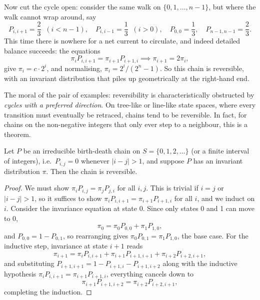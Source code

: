 \documentclass[a4paper]{scrartcl}
\begin{document}
\begin{example}
	Now cut the cycle open: consider the same walk on $\{0, 1, \dots, n - 1\}$, but where the walk cannot wrap around, say
	$$
	P_{i, i + 1} = \frac{2}{3} \;\; (i < n - 1), \quad P_{i, i - 1} = \frac{1}{3} \;\; (i > 0), \quad P_{0, 0} = \frac{1}{3}, \quad P_{n - 1, n - 1} = \frac{2}{3}.
	$$
	This time there is nowhere for a net current to circulate, and indeed detailed balance succeeds: the equations
	$$
	\pi_i P_{i, i + 1} = \pi_{i + 1}P_{i + 1, i} \implies \pi_{i + 1} = 2\pi_i,
	$$
	give $\pi_i = c \cdot 2^i$, and normalising, $\pi_i = 2^i / (2^n - 1)$. So this chain is reversible, with an invariant distribution that piles up geometrically at the right-hand end.
\end{example}

The moral of the pair of examples: reversibility is characteristically obstructed by \emph{cycles with a preferred direction}. On tree-like or line-like state spaces, where every transition must eventually be retraced, chains tend to be reversible. In fact, for chains on the non-negative integers that only ever step to a neighbour, this is a theorem.

\begin{proposition}
	Let $P$ be an irreducible birth-death chain on $S = \{0, 1, 2, \dots\}$ (or a finite interval of integers), i.e.\ $P_{i, j} = 0$ whenever $|i - j| > 1$, and suppose $P$ has an invariant distribution $\pi$. Then the chain is reversible.
\end{proposition}
\begin{proof}
	We must show $\pi_i P_{i, j} = \pi_j P_{j, i}$ for all $i, j$. This is trivial if $i = j$ or $|i - j| > 1$, so it suffices to show $\pi_i P_{i, i + 1} = \pi_{i + 1}P_{i + 1, i}$ for all $i$, and we induct on $i$. Consider the invariance equation at state 0. Since only states 0 and 1 can move to 0,
	$$
	\pi_0 = \pi_0 P_{0, 0} + \pi_1 P_{1, 0},
	$$
	and $P_{0, 0} = 1 - P_{0, 1}$, so rearranging gives $\pi_0 P_{0, 1} = \pi_1 P_{1, 0}$, the base case. For the inductive step, invariance at state $i + 1$ reads
	$$
	\pi_{i + 1} = \pi_i P_{i, i + 1} + \pi_{i + 1}P_{i + 1, i + 1} + \pi_{i + 2}P_{i + 2, i + 1},
	$$
	and substituting $P_{i + 1, i + 1} = 1 - P_{i + 1, i} - P_{i + 1, i + 2}$ along with the inductive hypothesis $\pi_i P_{i, i + 1} = \pi_{i + 1}P_{i + 1, i}$, everything cancels down to
	$$
	\pi_{i + 1}P_{i + 1, i + 2} = \pi_{i + 2}P_{i + 2, i + 1},
	$$
	completing the induction.
\end{proof}
\end{document}
